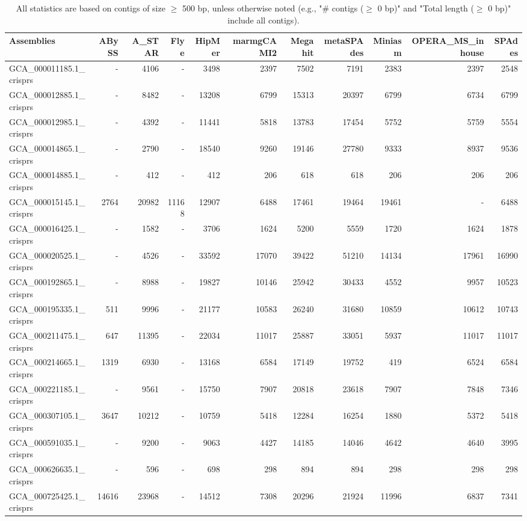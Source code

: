 \documentclass[12pt,a4paper]{article}
\begin{document}
\begin{table}[ht]
\begin{center}
\caption{All statistics are based on contigs of size $\geq$ 500 bp, unless otherwise noted (e.g., "\# contigs ($\geq$ 0 bp)" and "Total length ($\geq$ 0 bp)" include all contigs).}
\begin{tabular}{|l*{10}{|r}|}
\hline
Assemblies & ABySS & A\_STAR & Flye & HipMer & marmgCAMI2 & Megahit & metaSPAdes & Miniasm & OPERA\_MS\_inhouse & SPAdes \\ \hline
GCA\_000011185.1\_crisprs & - & 4106 & - & 3498 & 2397 & 7502 & 7191 & 2383 & 2397 & 2548 \\ \hline
GCA\_000012885.1\_crisprs & - & 8482 & - & 13208 & 6799 & 15313 & 20397 & 6799 & 6734 & 6799 \\ \hline
GCA\_000012985.1\_crisprs & - & 4392 & - & 11441 & 5818 & 13783 & 17454 & 5752 & 5759 & 5554 \\ \hline
GCA\_000014865.1\_crisprs & - & 2790 & - & 18540 & 9260 & 19146 & 27780 & 9333 & 8937 & 9536 \\ \hline
GCA\_000014885.1\_crisprs & - & 412 & - & 412 & 206 & 618 & 618 & 206 & 206 & 206 \\ \hline
GCA\_000015145.1\_crisprs & 2764 & 20982 & 11168 & 12907 & 6488 & 17461 & 19464 & 19461 & - & 6488 \\ \hline
GCA\_000016425.1\_crisprs & - & 1582 & - & 3706 & 1624 & 5200 & 5559 & 1720 & 1624 & 1878 \\ \hline
GCA\_000020525.1\_crisprs & - & 4526 & - & 33592 & 17070 & 39422 & 51210 & 14134 & 17961 & 16990 \\ \hline
GCA\_000192865.1\_crisprs & - & 8988 & - & 19827 & 10146 & 25942 & 30433 & 4552 & 9957 & 10523 \\ \hline
GCA\_000195335.1\_crisprs & 511 & 9996 & - & 21177 & 10583 & 26240 & 31680 & 10859 & 10612 & 10743 \\ \hline
GCA\_000211475.1\_crisprs & 647 & 11395 & - & 22034 & 11017 & 25887 & 33051 & 5937 & 11017 & 11017 \\ \hline
GCA\_000214665.1\_crisprs & 1319 & 6930 & - & 13168 & 6584 & 17149 & 19752 & 419 & 6524 & 6584 \\ \hline
GCA\_000221185.1\_crisprs & - & 9561 & - & 15750 & 7907 & 20818 & 23618 & 7907 & 7848 & 7346 \\ \hline
GCA\_000307105.1\_crisprs & 3647 & 10212 & - & 10759 & 5418 & 12284 & 16254 & 1880 & 5372 & 5418 \\ \hline
GCA\_000591035.1\_crisprs & - & 9200 & - & 9063 & 4427 & 14185 & 14046 & 4642 & 4640 & 3995 \\ \hline
GCA\_000626635.1\_crisprs & - & 596 & - & 698 & 298 & 894 & 894 & 298 & 298 & 298 \\ \hline
GCA\_000725425.1\_crisprs & 14616 & 23968 & - & 14512 & 7308 & 20296 & 21924 & 11996 & 6837 & 7341 \\ \hline
\end{tabular}
\end{center}
\end{table}
\end{document}
